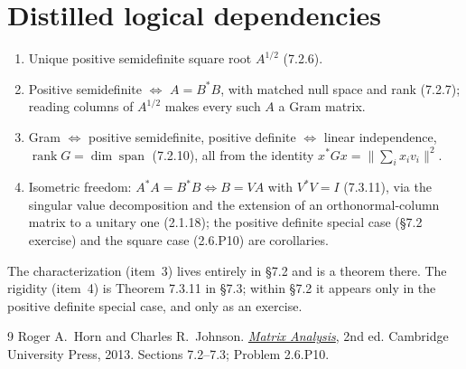 \documentclass[11pt]{article}
\newcommand{\adj}{^{*}}
\DeclareMathOperator{\rank}{rank}
\DeclareMathOperator{\spann}{span}
\theoremstyle{definition}
\begin{document}
\section{Distilled logical dependencies}

\begin{enumerate}
\item Unique positive semidefinite square root $A^{1/2}$ (7.2.6).
\item Positive semidefinite $\iff$ $A=B\adj B$, with matched null space and rank
  (7.2.7); reading columns of $A^{1/2}$ makes every such $A$ a Gram matrix.
\item Gram $\iff$ positive semidefinite, positive definite $\iff$ linear
  independence, $\rank G=\dim\spann$ (7.2.10), all from the identity
  $x\adj Gx=\bigl\|\sum_i x_i v_i\bigr\|^2$.
\item Isometric freedom: $A\adj A=B\adj B\iff B=VA$ with $V\adj V=I$ (7.3.11),
  via the singular value decomposition and the extension of an orthonormal-column
  matrix to a unitary one (2.1.18); the positive definite special case (\S7.2
  exercise) and the square case (2.6.P10) are corollaries.
\end{enumerate}

The characterization (item~3) lives entirely in \S7.2 and is a theorem there.  The
rigidity (item~4) is Theorem 7.3.11 in \S7.3; within \S7.2 it appears only in the
positive definite special case, and only as an exercise.

\begin{thebibliography}{9}
Roger A.\ Horn and Charles R.\ Johnson.
\newblock \href{https://doi.org/10.1017/CBO9781139020411}{\emph{Matrix Analysis}}, 2nd ed.
\newblock Cambridge University Press, 2013.
\newblock Sections 7.2--7.3; Problem 2.6.P10.
\end{thebibliography}
\end{document}
